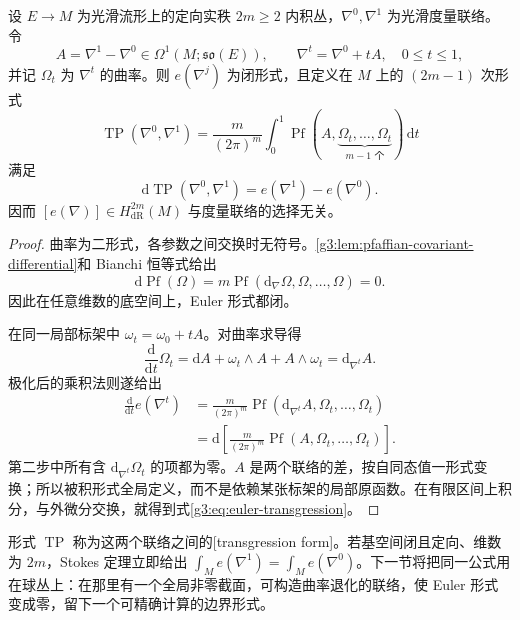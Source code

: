 \begin{theorem}\label{g3:thm:euler-chern-weil}
	设 \(E\to M\) 为光滑流形上的定向实秩 \(2m\ge2\) 内积丛，\(\nabla^0,\nabla^1\) 为光滑度量联络。令
	\[
		A=\nabla^1-\nabla^0\in\Omega^1(M;\mathfrak{so}(E)),\qquad
		\nabla^t=\nabla^0+tA,\quad 0\le t\le1,
	\]
	并记 \(\Omega_t\) 为 \(\nabla^t\) 的曲率。则 \(e(\nabla^j)\) 为闭形式，且定义在 \(M\) 上的 \((2m-1)\) 次形式
	\begin{equation}\label{g3:eq:euler-transgression-form}
		\operatorname{TP}(\nabla^0,\nabla^1)
		=\frac{m}{(2\pi)^m}\int_0^1
		\operatorname{Pf}(A,\underbrace{\Omega_t,\ldots,\Omega_t}_{m-1\text{ 个}})\,\mathrm dt
	\end{equation}
	满足
	\begin{equation}\label{g3:eq:euler-transgression}
		\mathrm d\operatorname{TP}(\nabla^0,\nabla^1)
		=e(\nabla^1)-e(\nabla^0).
	\end{equation}
	因而 \([e(\nabla)]\in H_{\mathrm{dR}}^{2m}(M)\) 与度量联络的选择无关。
\end{theorem}
\begin{proof}
	曲率为二形式，各参数之间交换时无符号。\cref{g3:lem:pfaffian-covariant-differential}和 Bianchi 恒等式给出
	\[
		\mathrm d\operatorname{Pf}(\Omega)=m\operatorname{Pf}(\mathrm d_\nabla\Omega,\Omega,\ldots,\Omega)=0.
	\]
	因此在任意维数的底空间上，Euler 形式都闭。

	在同一局部标架中 \(\omega_t=\omega_0+tA\)。对曲率求导得
	\[
		\frac{\mathrm d}{\mathrm dt}\Omega_t
		=\mathrm dA+\omega_t\wedge A+A\wedge\omega_t
		=\mathrm d_{\nabla^t}A.
	\]
	极化后的乘积法则遂给出
	\[
		\begin{aligned}
			\frac{\mathrm d}{\mathrm dt}e(\nabla^t)
			&=\frac{m}{(2\pi)^m}\operatorname{Pf}(\mathrm d_{\nabla^t}A,\Omega_t,\ldots,\Omega_t)\\
			&=\mathrm d\left[\frac{m}{(2\pi)^m}\operatorname{Pf}(A,\Omega_t,\ldots,\Omega_t)\right].
		\end{aligned}
	\]
	第二步中所有含 \(\mathrm d_{\nabla^t}\Omega_t\) 的项都为零。\(A\) 是两个联络的差，按自同态值一形式变换；所以被积形式全局定义，而不是依赖某张标架的局部原函数。在有限区间上积分，与外微分交换，就得到式\eqref{g3:eq:euler-transgression}。
\end{proof}

形式 \(\operatorname{TP}\) 称为这两个联络之间的[transgression form]。若基空间闭且定向、维数为 \(2m\)，Stokes 定理立即给出 \(\int_Me(\nabla^1)=\int_Me(\nabla^0)\)。下一节将把同一公式用在球丛上：在那里有一个全局非零截面，可构造曲率退化的联络，使 Euler 形式变成零，留下一个可精确计算的边界形式。

